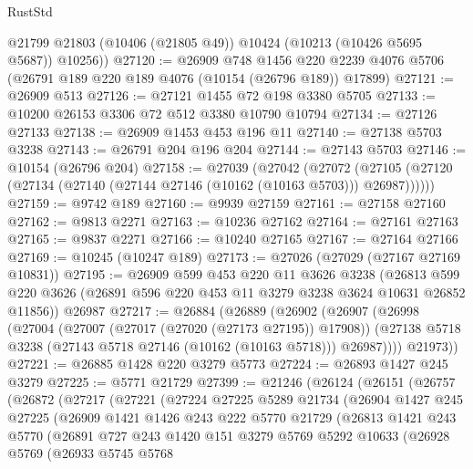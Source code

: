 \begin{lexlean}{RustStd}
\begin{coremodule}
{\begin{coremodule}
{{{{{{{{{{{{{{{{{{{{{{{{{{        @21799
        @21803
        (@10406 (@21805 @49))
        @10424
        (@10213 (@10426 @5695 @5687))
        @10256))
@27120 := @26909
    @748
    @1456
    @220
    @2239
    @4076
    @5706
    (@26791 @189 @220 @189 @4076 (@10154 (@26796 @189)) @17899)
@27121 := @26909 @513
@27126 := @27121 @1455 @72 @198 @3380 @5705
@27133 := @10200 @26153 @3306 @72 @512 @3380 @10790 @10794
@27134 := @27126 @27133
@27138 := @26909 @1453 @453 @196 @11
@27140 := @27138 @5703 @3238
@27143 := @26791 @204 @196 @204
@27144 := @27143 @5703
@27146 := @10154 (@26796 @204)
@27158 := @27039
    (@27042
      (@27072 (@27105 (@27120 (@27134 (@27140 (@27144 @27146 (@10162 (@10163 @5703))) @26987))))))
@27159 := @9742 @189
@27160 := @9939 @27159
@27161 := @27158 @27160
@27162 := @9813 @2271
@27163 := @10236 @27162
@27164 := @27161 @27163
@27165 := @9837 @2271
@27166 := @10240 @27165
@27167 := @27164 @27166
@27169 := @10245 (@10247 @189)
@27173 := @27026 (@27029 (@27167 @27169 @10831))
@27195 := @26909
    @599
    @453
    @220
    @11
    @3626
    @3238
    (@26813 @599 @220 @3626 (@26891 @596 @220 @453 @11 @3279 @3238 @3624 @10631 @26852 @11856))
    @26987
@27217 := @26884
    (@26889
      (@26902
        (@26907
          (@26998
            (@27004
              (@27007 (@27017 (@27020 (@27173 @27195)) @17908))
              (@27138 @5718 @3238 (@27143 @5718 @27146 (@10162 (@10163 @5718))) @26987))))
        @21973))
@27221 := @26885 @1428 @220 @3279 @5773
@27224 := @26893 @1427 @245 @3279
@27225 := @5771 @21729
@27399 := @21246
    (@26124
      (@26151
        (@26757
          (@26872
            (@27217
              (@27221
                (@27224
                  @27225
                  @5289
                  @21734
                  (@26904
                    @1427
                    @245
                    @27225
                    (@26909
                      @1421
                      @1426
                      @243
                      @222
                      @5770
                      @21729
                      (@26813
                        @1421
                        @243
                        @5770
                        (@26891
                          @727
                          @243
                          @1420
                          @151
                          @3279
                          @5769
                          @5292
                          @10633
                          (@26928
                            @5769
                            (@26933
                              @5745
                              @5768
}}}}}}}}}}}}}}}}}}}}}}}}}}
\end{coremodule}}
\end{coremodule}
\end{lexlean}
